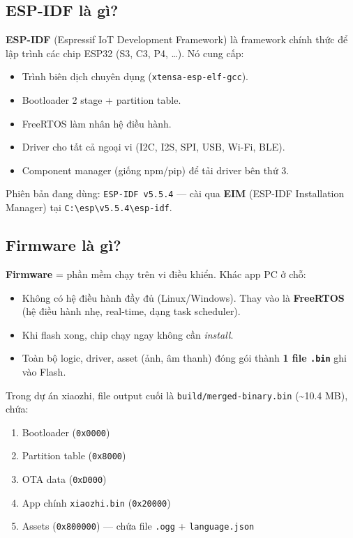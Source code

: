 \documentclass[11pt,a4paper]{article}
\begin{document}
\subsection{ESP-IDF là gì?}
\textbf{ESP-IDF} (Espressif IoT Development Framework) là framework chính thức để lập trình các chip ESP32 (S3, C3, P4, \ldots). Nó cung cấp:
\begin{itemize}
  \item Trình biên dịch chuyên dụng (\texttt{xtensa-esp-elf-gcc}).
  \item Bootloader 2 stage + partition table.
  \item FreeRTOS làm nhân hệ điều hành.
  \item Driver cho tất cả ngoại vi (I2C, I2S, SPI, USB, Wi-Fi, BLE).
  \item Component manager (giống npm/pip) để tải driver bên thứ 3.
\end{itemize}
Phiên bản đang dùng: \texttt{ESP-IDF v5.5.4} — cài qua \textbf{EIM} (ESP-IDF Installation Manager) tại \texttt{C:\textbackslash esp\textbackslash v5.5.4\textbackslash esp-idf}.

\subsection{Firmware là gì?}
\textbf{Firmware} = phần mềm chạy trên vi điều khiển. Khác app PC ở chỗ:
\begin{itemize}
  \item Không có hệ điều hành đầy đủ (Linux/Windows). Thay vào là \textbf{FreeRTOS} (hệ điều hành nhẹ, real-time, dạng task scheduler).
  \item Khi flash xong, chip chạy ngay không cần \textit{install}.
  \item Toàn bộ logic, driver, asset (ảnh, âm thanh) đóng gói thành \textbf{1 file \texttt{.bin}} ghi vào Flash.
\end{itemize}
Trong dự án xiaozhi, file output cuối là \texttt{build/merged-binary.bin} (\textasciitilde 10.4 MB), chứa:
\begin{enumerate}
  \item Bootloader (\texttt{0x0000})
  \item Partition table (\texttt{0x8000})
  \item OTA data (\texttt{0xD000})
  \item App chính \texttt{xiaozhi.bin} (\texttt{0x20000})
  \item Assets (\texttt{0x800000}) — chứa file \texttt{.ogg} + \texttt{language.json}
\end{enumerate}
\end{document}
